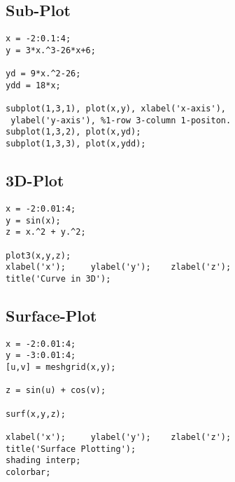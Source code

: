 \vspace{5mm}

\subsection{Sub-Plot}
\begin{verbatim}
x = -2:0.1:4;
y = 3*x.^3-26*x+6;

yd = 9*x.^2-26;
ydd = 18*x;

subplot(1,3,1), plot(x,y), xlabel('x-axis'),
 ylabel('y-axis'), %1-row 3-column 1-positon.
subplot(1,3,2), plot(x,yd);
subplot(1,3,3), plot(x,ydd);
\end{verbatim}
\clearpage


\subsection{3D-Plot}
\begin{verbatim}
x = -2:0.01:4;
y = sin(x);
z = x.^2 + y.^2;

plot3(x,y,z);
xlabel('x');     ylabel('y');    zlabel('z');
title('Curve in 3D');
\end{verbatim}

\vspace{25mm}

\subsection{Surface-Plot}
\begin{verbatim}
x = -2:0.01:4;
y = -3:0.01:4;
[u,v] = meshgrid(x,y);

z = sin(u) + cos(v);

surf(x,y,z);

xlabel('x');     ylabel('y');    zlabel('z');
title('Surface Plotting');
shading interp;
colorbar;
\end{verbatim}

